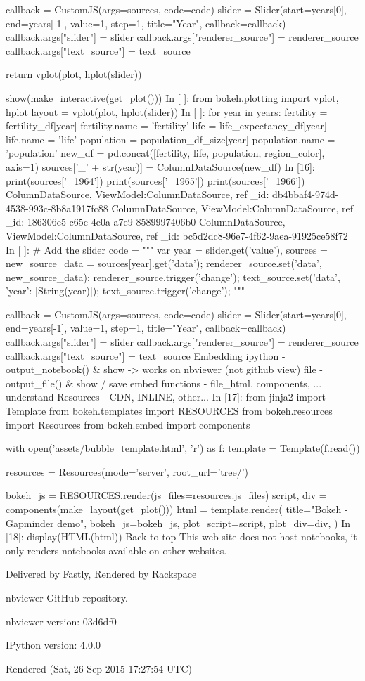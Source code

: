     callback = CustomJS(args=sources, code=code)
    slider = Slider(start=years[0], end=years[-1], value=1, step=1, title="Year", callback=callback)
    callback.args["slider"] = slider
    callback.args["renderer_source"] = renderer_source
    callback.args["text_source"] = text_source

    
    return vplot(plot, hplot(slider))

show(make_interactive(get_plot()))
In [ ]:
from bokeh.plotting import vplot, hplot
layout = vplot(plot, hplot(slider))
In [ ]:
for year in years:
    fertility = fertility_df[year]
    fertility.name = 'fertility'
    life = life_expectancy_df[year]
    life.name = 'life'
    population = population_df_size[year]
    population.name = 'population'
    new_df = pd.concat([fertility, life, population, region_color], axis=1)
    sources['_' + str(year)] = ColumnDataSource(new_df)
In [16]:
print(sources['_1964'])
print(sources['_1965'])
print(sources['_1966'])
ColumnDataSource, ViewModel:ColumnDataSource, ref _id: db4bbaf4-974d-4538-993c-8b8a1917fc88
ColumnDataSource, ViewModel:ColumnDataSource, ref _id: 186306e5-c65c-4e0a-a7e9-8589997406b0
ColumnDataSource, ViewModel:ColumnDataSource, ref _id: bc5d2dc8-96e7-4f62-9aea-91925ce58f72
In [ ]:
# Add the slider
code = """
    var year = slider.get('value'),
        sources = %
        new_source_data = sources[year].get('data');
    renderer_source.set('data', new_source_data);
    renderer_source.trigger('change');
    text_source.set('data', {'year': [String(year)]});
    text_source.trigger('change');
""" %

callback = CustomJS(args=sources, code=code)
slider = Slider(start=years[0], end=years[-1], value=1, step=1, title="Year", callback=callback)
callback.args["slider"] = slider
callback.args["renderer_source"] = renderer_source
callback.args["text_source"] = text_source
Embedding
ipython - output_notebook() & show -> works on nbviewer (not github view)
file - output_file() & show / save
embed functions - file_html, components, ...
understand Resources - CDN, INLINE, other...
In [17]:
from jinja2 import Template
from bokeh.templates import RESOURCES
from bokeh.resources import Resources
from bokeh.embed import components

with open('assets/bubble_template.html', 'r') as f:
    template = Template(f.read())

resources = Resources(mode='server', root_url='tree/')

bokeh_js = RESOURCES.render(js_files=resources.js_files)
script, div = components(make_layout(get_plot()))
html = template.render(
    title="Bokeh - Gapminder demo",
    bokeh_js=bokeh_js,
    plot_script=script,
    plot_div=div,
)
In [18]:
display(HTML(html))
Back to top
This web site does not host notebooks, it only renders notebooks available on other websites.

Delivered by Fastly, Rendered by Rackspace

nbviewer GitHub repository.

nbviewer version: 03d6df0

IPython version: 4.0.0

Rendered (Sat, 26 Sep 2015 17:27:54 UTC)
